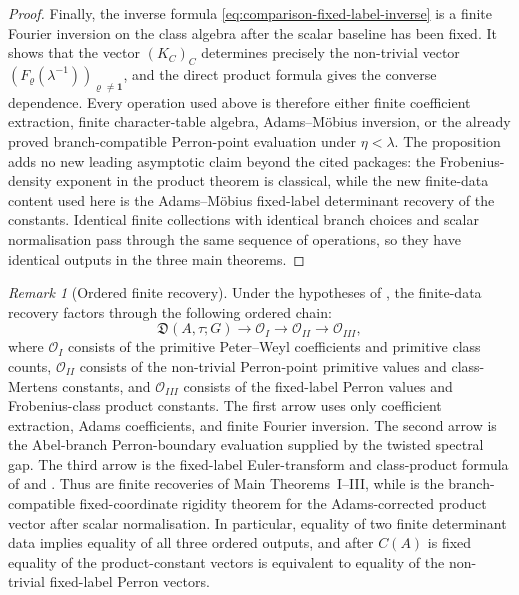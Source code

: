 \documentclass[11pt,a4paper]{amsart}
\theoremstyle{plain}
\theoremstyle{definition}
\theoremstyle{remark}
\newtheorem{remark}[theorem]{Remark}
\begin{document}
\begin{proof}
  Finally, the inverse formula \eqref{eq:comparison-fixed-label-inverse} is a
  finite Fourier inversion on the class algebra after the scalar baseline has
  been fixed.  It shows that the vector \((K_C)_C\) determines precisely the
  non-trivial vector \((F_\varrho(\lambda^{-1}))_{\varrho\ne\mathbf1}\), and
  the direct product formula gives the converse dependence.  Every operation
  used above is therefore either finite coefficient extraction, finite
  character-table algebra, Adams--M\"obius inversion, or the already proved
  branch-compatible Perron-point evaluation under \(\eta<\lambda\).  The
  proposition adds no new leading asymptotic claim beyond the cited packages:
  the Frobenius-density exponent in the product theorem is classical, while the
  new finite-data content used here is the Adams--M\"obius fixed-label
  determinant recovery of the constants.  Identical
  finite collections with identical branch choices and scalar normalisation pass
  through the same sequence of operations, so they have identical outputs in
  the three main theorems.
\end{proof}

\begin{remark}[Ordered finite recovery]
  \label{rem:assembled-recovery-dependency-order}
  Under the hypotheses of , the
  finite-data recovery factors through the following ordered chain:
  \begin{equation}\label{eq:assembled-recovery-dependency-order}
    \mathfrak D(A,\tau;G)
    \longrightarrow
    \mathcal O_I
    \longrightarrow
    \mathcal O_{II}
    \longrightarrow
    \mathcal O_{III},
  \end{equation}
  where \(\mathcal O_I\) consists of the primitive Peter--Weyl coefficients
  and primitive class counts, \(\mathcal O_{II}\) consists of the
  non-trivial Perron-point primitive values and class-Mertens constants, and
  \(\mathcal O_{III}\) consists of the fixed-label Perron values and
  Frobenius-class product constants.  The first arrow uses only coefficient
  extraction, Adams coefficients, and finite Fourier inversion.  The second
  arrow is the Abel-branch Perron-boundary evaluation supplied by the
  twisted spectral gap.  The third arrow is the fixed-label Euler-transform
  and class-product formula of  and
  .  Thus
  are finite recoveries of Main Theorems~I--III, while
   is the branch-compatible
  fixed-coordinate rigidity theorem for the Adams-corrected product vector
  after scalar normalisation.
  In particular, equality of two finite determinant data implies equality
  of all three ordered outputs, and after \(C(A)\) is fixed equality of the
  product-constant vectors is equivalent to equality of the non-trivial
  fixed-label Perron vectors.
\end{remark}
\end{document}
